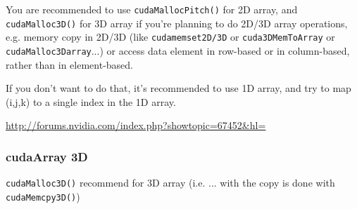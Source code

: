 \begin{framed}
  You are recommended to use \verb!cudaMallocPitch()! for 2D array,
  and \verb!cudaMalloc3D()! for 3D array if you're planning to do
  2D/3D array operations, e.g. memory copy in 2D/3D (like
  \verb!cudamemset2D/3D! or \verb!cuda3DMemToArray! or
  \verb!cudaMalloc3Darray!...) or access data element in row-based or
  in column-based, rather than in element-based.

  If you don't want to do that, it's recommended to use 1D array, and
  try to map (i,j,k) to a single index in the 1D array. 
\end{framed}

% 

\url{http://forums.nvidia.com/index.php?showtopic=67452&hl=}


\subsubsection{cudaArray 3D}
\label{sec:cudaArray_3D}

\verb!cudaMalloc3D()! recommend for 3D array (i.e. ... with the
  copy is done with \verb!cudaMemcpy3D()!) 


